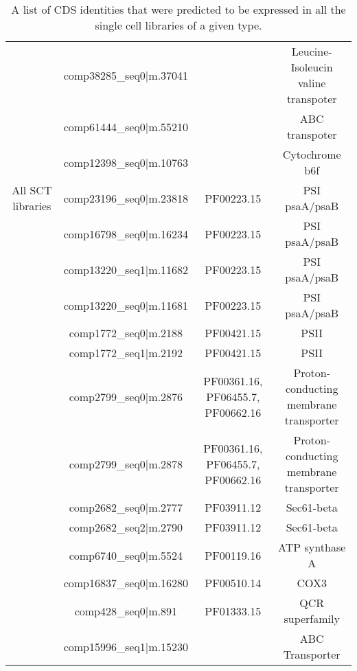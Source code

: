\begin{table}
\begin{tabular}{|c|c|c|c|}
                            & comp38285\_seq0|m.37041 & & Leucine-Isoleucin valine transpoter \\
                            & comp61444\_seq0|m.55210 & & ABC transpoter \\
                            & comp12398\_seq0|m.10763 & & Cytochrome b6f \\
        \hline
        All SCT libraries   & comp23196\_seq0|m.23818 & PF00223.15 & PSI psaA/psaB \\
                            &  comp16798\_seq0|m.16234 & PF00223.15 & PSI psaA/psaB \\
                            &  comp13220\_seq1|m.11682 & PF00223.15 & PSI psaA/psaB \\
                            &  comp13220\_seq0|m.11681 & PF00223.15 & PSI psaA/psaB \\ 
                            &  comp1772\_seq0|m.2188  & PF00421.15 & PSII \\
                            &  comp1772\_seq1|m.2192 & PF00421.15 & PSII \\
                            &  comp2799\_seq0|m.2876  & PF00361.16, PF06455.7, PF00662.16 & Proton-conducting membrane transporter\\ %
                            &  comp2799\_seq0|m.2878 & PF00361.16, PF06455.7, PF00662.16 & Proton-conducting membrane transporter\\ %
                            &  comp2682\_seq0|m.2777& PF03911.12 & Sec61-beta \\
                            &  comp2682\_seq2|m.2790& PF03911.12 & Sec61-beta \\
                            &  comp6740\_seq0|m.5524& PF00119.16 & ATP synthase A \\
                            &  comp16837\_seq0|m.16280& PF00510.14 & COX3 \\
                            &  comp428\_seq0|m.891& PF01333.15 & QCR superfamily \\
                            &  comp15996\_seq1|m.15230 & & ABC Transporter \\
        \hline
    \end{tabular}
    \caption{A list of CDS identities that were predicted to be expressed in all the single cell
    libraries of a given type.}
    \label{tab:consensus_transporters}
\end{table}

